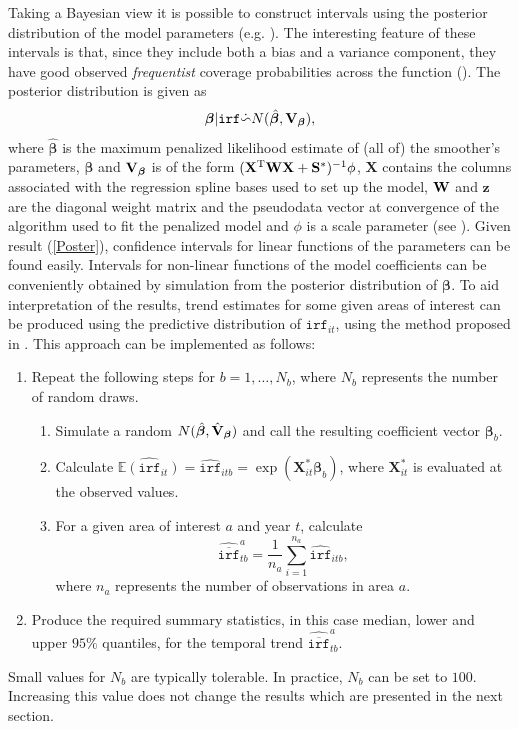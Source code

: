 Taking a Bayesian view it is possible to construct intervals using the posterior distribution of the model parameters (e.g. \cite{rwc}). The interesting feature of these intervals is that, since they include both a bias and a variance component, they have good observed \textit{frequentist} coverage probabilities across the function (\cite{Marra2011}). The posterior distribution is given as
\begin{equation}
\bm\beta|\texttt{irf} \dot{\backsim} N( \hat{\bm\beta}, {\bf V}_{\bm\beta} ),
\label{Poster}
\end{equation}
where $\hat{\bm\beta}$ is the maximum penalized likelihood estimate of (all of) the smoother's parameters, $\bm\beta$ and ${\bf V}_{\bm\beta}$ is of the form $(\mathbf{X}^\text{T}{\bf W}\mathbf{X}+{\bf S}^*)^{-1}\phi$, $\mathbf{X}$ contains the columns associated with the regression spline bases used to set up the model, ${\bf W}$ and $\mathbf{z}$ are the diagonal weight matrix and the pseudodata vector at convergence of the algorithm used to fit the penalized model and $\phi$ is a scale parameter (see ). Given result (\ref{Poster}), confidence intervals for linear functions of the parameters can be found easily. Intervals for non-linear functions of the model coefficients can be conveniently obtained by simulation from the posterior distribution of $\bm\beta$. To aid interpretation of the results, trend estimates for some given areas of interest can be produced using the predictive distribution of $\texttt{irf}_{it}$, using the method proposed in . This approach can be implemented as follows:

\begin{enumerate}
	\item Repeat the following steps for $b=1,\ldots,N_b$, where $N_b$ represents the number of random draws. 
	   \begin{enumerate}
	      \item Simulate a random $N(\hat{\bm\beta}, \hat{{\bf V}}_{\bm\beta} )$ and call the resulting coefficient vector $\bm\beta_b$.
	      \item Calculate $\widehat{\mathbb{E}(\texttt{irf}_{it})}=\widehat{\texttt{irf}}_{itb}=\exp(\mathbf{X}^*_{it}\bm\beta_b)$, where $\mathbf{X}^*_{it}$ is evaluated at the observed values. 
	      \item For a given area of interest $a$ and year $t$, calculate
	      $$\widehat{\overline{\texttt{irf}}}_{tb}^a=\frac{1}{n_a}\sum_{i=1}^{n_a} \widehat{\texttt{irf}}_{itb},$$
	      where $n_a$ represents the number of observations in area $a$.     
	   \end{enumerate}
	\item Produce the required summary statistics, in this case median, lower and upper $95\%$ quantiles, for the temporal trend $\widehat{\overline{\texttt{irf}}}_{tb}^a$.
\end{enumerate}
Small values for $N_b$ are typically tolerable. In practice, $N_b$ can be set to $100$. Increasing this value does not change the results which are presented in the next section.
 

